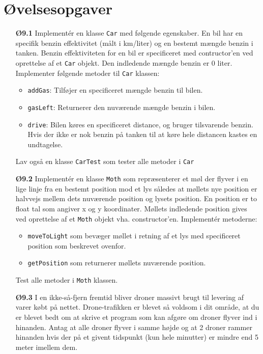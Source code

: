 \documentclass[12pt]{article}
\begin{document}
\section*{Øvelsesopgaver}
\begin{itemize}
\item[\textbf{Ø9.1}] Implementér en klasse \texttt{Car} med følgende egenskaber. En bil har en specifik benzin effektivitet
(målt i km/liter) og en bestemt mængde benzin i tanken. Benzin effektiviteten for en bil er specificeret med contructor'en
ved oprettelse af et \texttt{Car} objekt. Den indledende mængde benzin er 0 liter. Implementer følgende metoder til 
\texttt{Car} klassen:
\begin{itemize}
\item \texttt{addGas}: Tilføjer en specificeret mængde benzin til bilen.
\item \texttt{gasLeft}: Returnerer den nuværende mængde benzin i bilen.
\item \texttt{drive}: Bilen køres en specificeret distance, og bruger tilsvarende benzin. Hvis der ikke er nok benzin
på tanken til at køre hele distancen kastes en undtagelse.
\end{itemize}
Lav også en klasse \texttt{CarTest} som tester alle metoder i \texttt{Car}
\item[\textbf{Ø9.2}] Implementér en klasse \texttt{Moth} som repræsenterer et møl der flyver i en lige linje fra en
bestemt position mod et lys således at møllets nye position er halvvejs mellem dets nuværende 
position og lysets position.
En position er to float tal som angiver x og y koordinater. Møllets indledende position gives ved oprettelse af et \texttt{Moth}
objekt vha. constructor'en.
Implementér metoderne:
\begin{itemize}
\item \texttt{moveToLight} som bevæger møllet i retning af et lys med specificeret position som beskrevet ovenfor.
\item \texttt{getPosition} som returnerer møllets nuværende position.
\end{itemize}
Test alle metoder i \texttt{Moth} klassen.
\item[\textbf{Ø9.3}] I en ikke-så-fjern fremtid bliver droner massivt brugt til levering af varer købt på nettet.
Drone-trafikken er blevet så voldsom i dit område, at du er blevet bedt om at skrive et program som kan afgøre om droner
flyver ind i hinanden. Antag at alle droner flyver i samme højde og at 2 droner rammer hinanden hvis der på et givent
tidspunkt (kun hele minutter) er mindre end 5 meter imellem dem. 

\end{itemize}
\end{document}
